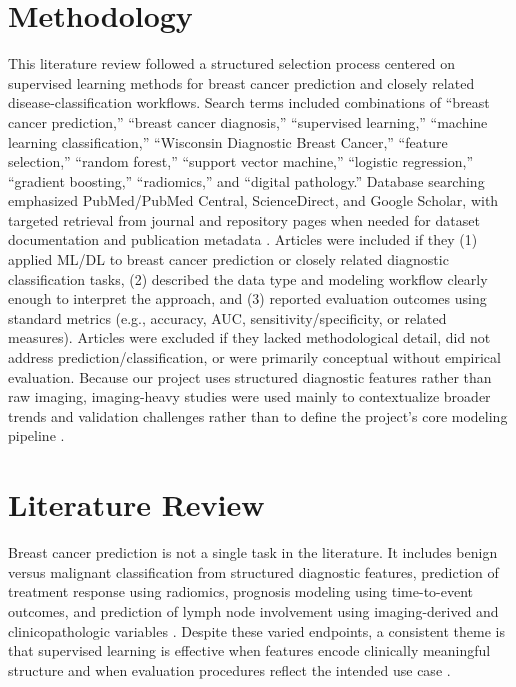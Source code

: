 \documentclass[conference]{IEEEtran}
\begin{document}
\section{Methodology}
This literature review followed a structured selection process centered on supervised learning methods for breast cancer prediction and closely related disease-classification workflows. Search terms included combinations of ``breast cancer prediction,'' ``breast cancer diagnosis,'' ``supervised learning,'' ``machine learning classification,'' ``Wisconsin Diagnostic Breast Cancer,'' ``feature selection,'' ``random forest,'' ``support vector machine,'' ``logistic regression,'' ``gradient boosting,'' ``radiomics,'' and ``digital pathology.'' Database searching emphasized PubMed/PubMed Central, ScienceDirect, and Google Scholar, with targeted retrieval from journal and repository pages when needed for dataset documentation and publication metadata \cite{b2,b12}. Articles were included if they (1) applied ML/DL to breast cancer prediction or closely related diagnostic classification tasks, (2) described the data type and modeling workflow clearly enough to interpret the approach, and (3) reported evaluation outcomes using standard metrics (e.g., accuracy, AUC, sensitivity/specificity, or related measures). Articles were excluded if they lacked methodological detail, did not address prediction/classification, or were primarily conceptual without empirical evaluation. Because our project uses structured diagnostic features rather than raw imaging, imaging-heavy studies were used mainly to contextualize broader trends and validation challenges rather than to define the project's core modeling pipeline \cite{b7,b8}. 

\section{Literature Review}
Breast cancer prediction is not a single task in the literature. It includes benign versus malignant classification from structured diagnostic features, prediction of treatment response using radiomics, prognosis modeling using time-to-event outcomes, and prediction of lymph node involvement using imaging-derived and clinicopathologic variables \cite{b14,b15,b16}. Despite these varied endpoints, a consistent theme is that supervised learning is effective when features encode clinically meaningful structure and when evaluation procedures reflect the intended use case \cite{b7,b10}.
\end{document}
